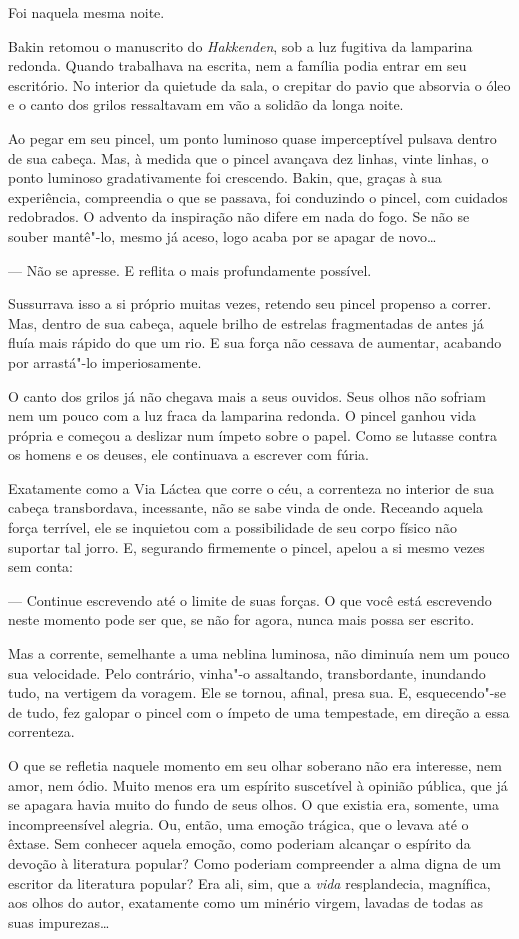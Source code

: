 Foi naquela mesma noite.

Bakin retomou o manuscrito do \textit{Hakkenden}, sob a luz fugitiva da
lamparina redonda. Quando trabalhava na escrita, nem a família podia
entrar em seu escritório. No interior da quietude da sala, o crepitar
do pavio que absorvia o óleo e o canto dos grilos ressaltavam em vão a
solidão da longa noite.

Ao pegar em seu pincel, um ponto luminoso quase imperceptível pulsava
dentro de sua cabeça. Mas, à medida que o pincel avançava dez linhas,
vinte linhas, o ponto luminoso gradativamente foi crescendo. Bakin,
que, graças à sua experiência, compreendia o que se passava, foi
conduzindo o pincel, com cuidados redobrados. O advento da inspiração
não difere em nada do fogo. Se não se souber mantê"-lo, mesmo já aceso,
logo acaba por se apagar de novo\ldots{}

--- Não se apresse. E reflita o mais profundamente possível.

Sussurrava isso a si próprio muitas vezes, retendo seu pincel propenso a
correr. Mas, dentro de sua cabeça, aquele brilho de estrelas
fragmentadas de antes já fluía mais rápido do que um rio. E sua força
não cessava de aumentar, acabando por arrastá"-lo imperiosamente.

O canto dos grilos já não chegava mais a seus ouvidos. Seus olhos não
sofriam nem um pouco com a luz fraca da lamparina redonda. O pincel
ganhou vida própria e começou a deslizar num ímpeto sobre o papel. Como
se lutasse contra os homens e os deuses, ele continuava a escrever com
fúria.

Exatamente como a Via Láctea que corre o céu, a correnteza no interior
de sua cabeça transbordava, incessante, não se sabe vinda de onde.
Receando aquela força terrível, ele se inquietou com a possibilidade de
seu corpo físico não suportar tal jorro. E, segurando firmemente o
pincel, apelou a si mesmo vezes sem conta:

--- Continue escrevendo até o limite de suas forças. O que você está
escrevendo neste momento pode ser que, se não for agora, nunca mais
possa ser escrito.

Mas a corrente, semelhante a uma neblina luminosa, não diminuía nem um
pouco sua velocidade. Pelo contrário, vinha"-o assaltando,
transbordante, inundando tudo, na vertigem da voragem. Ele se tornou,
afinal, presa sua. E, esquecendo"-se de tudo, fez galopar o pincel com o
ímpeto de uma tempestade, em direção a essa correnteza.

O que se refletia naquele momento em seu olhar soberano não era
interesse, nem amor, nem ódio. Muito menos era um espírito suscetível à
opinião pública, que já se apagara havia muito do fundo de seus olhos.
O que existia era, somente, uma incompreensível alegria. Ou, então, uma
emoção trágica, que o levava até o êxtase. Sem conhecer aquela emoção,
como poderiam alcançar o espírito da devoção à literatura popular? Como
poderiam compreender a alma digna de um escritor da literatura popular?
Era ali, sim, que a \textit{vida} resplandecia, magnífica, aos olhos do autor,
exatamente como um minério virgem, lavadas de todas as suas
impurezas\ldots{}


